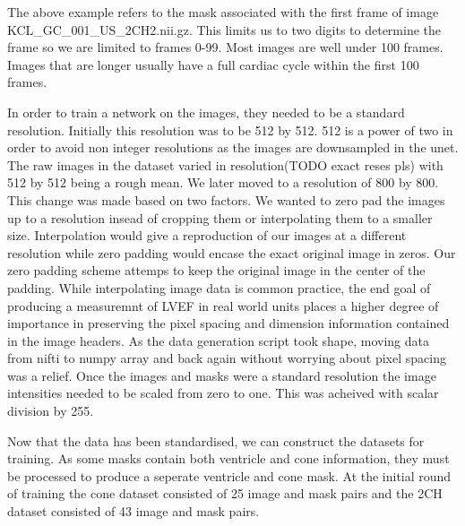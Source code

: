\documentclass[12pt]{article}
\begin{document}
The above example refers to the mask associated with the first frame of image KCL\_GC\_001\_US\_2CH2.nii.gz.
This limits us to two digits to determine the frame so we are limited to frames 0-99.
Most images are well under 100 frames. Images that are longer usually have a full cardiac cycle within the first 100 frames.
\par
In order to train a network on the images, they needed to be a standard resolution.
Initially this resolution was to be 512 by 512. 512 is a power of two in order to avoid non integer resolutions as the images are downsampled in the unet.
The raw images in the dataset varied in resolution(TODO exact reses pls) with 512 by 512 being a rough mean.
We later moved to a resolution of 800 by 800. This change was made based on two factors. 
We wanted to zero pad the images up to a resolution insead of cropping them or interpolating them to a smaller size.
Interpolation would give a reproduction of our images at a different resolution  while zero padding would encase the exact original image in zeros.
Our zero padding scheme attemps to keep the original image in the center of the padding.
While interpolating image data is common practice, the end goal of producing a measuremnt of LVEF in real world units places a higher degree of importance in preserving the pixel spacing and dimension information contained in the image headers.
As the data generation script took shape, moving data from nifti to numpy array and back again without worrying about pixel spacing was a relief.
Once the images and masks were a standard resolution the image intensities needed to be scaled from zero to one. This was acheived with scalar division by 255.
\par
Now that the data has been standardised, we can construct the datasets for training.
As some masks contain both ventricle and cone information, they must be processed to produce a seperate ventricle and cone mask.
At the initial round of training the cone dataset consisted of 25 image and mask pairs and the 2CH dataset consisted of 43 image and mask pairs.

\par
\end{document}
